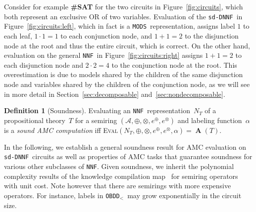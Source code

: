 \documentclass{article}
\theoremstyle{plain}
\theoremstyle{definition}
\newtheorem{definition}{Definition}
\newcommand{\NNF}{{\tt NNF}}
\newcommand{\sdDNNF}{{\tt sd-DNNF}}
\newcommand{\MODS}{{\tt MODS}}
\newcommand{\OBDDo}{{\tt OBDD$_<$}}
\begin{document}
Consider for example \textbf{\#SAT} for the two circuits in
Figure~\ref{fig:circuits}, which both represent an exclusive OR of two
variables. Evaluation of the \sdDNNF\ in Figure~\ref{fig:circuits:left}, which in fact
is a \MODS\ representation, assigns label $1$ to each leaf, 
$1\cdot 1=1$ to each conjunction
node, and 
$1+1=2$ to the disjunction
node at the root and thus the entire circuit, which is correct. On the
other hand, evaluation on the general \NNF\   in
Figure~\ref{fig:circuits:right} assigns $1+1=2$ to each disjunction
node and $2\cdot 2=4$ to the conjunction node at the root. This
overestimation is due to models shared by the children of the same
disjunction node and variables shared by the children of the
conjunction node, as we will see in more detail in Section~\ref{sec:decomposable} and~\ref{sec:nondecomposable}.   


\begin{definition}[Soundness]
Evaluating an \NNF\ representation~$N_T$ of a propositional theory~$T$
for a  semiring $(\mathcal{A},\oplus,\otimes,e^{\oplus},e^{\otimes})$
and labeling function~$\alpha$   is a
\emph{sound AMC computation} iff \textsc{Eval}$(N_T,\oplus,\otimes,e^{\oplus},e^{\otimes},\alpha) =\operatorname{\mathbf{A}}(T)$.
\end{definition}
In the following, we establish a general soundness result for AMC
evaluation on \sdDNNF\ circuits as
well as properties of AMC tasks that guarantee soundness for various
other subclasses of \NNF. Given soundness, we inherit the polynomial
complexity results of the knowledge compilation
map~\citep{darwiche2002knowledge} for 
semiring operators with unit cost.
Note however that there are semirings with more
expensive operators. For instance, labels in  \OBDDo\ may grow exponentially
in the circuit size.
\end{document}
